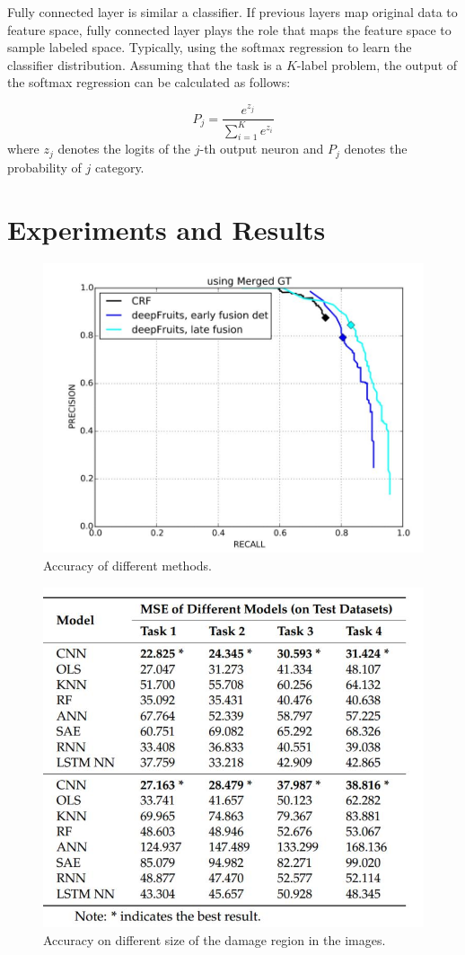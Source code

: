 \documentclass[sensors,article,submit,moreauthors,pdftex,10pt,a4paper]{mdpi}
\begin{document}
Fully connected layer is similar a classifier. If previous layers map original data to feature space, fully connected layer plays the role that maps the feature space to sample labeled space. Typically, using the softmax regression to learn the classifier distribution. Assuming that the task is a $K$-label problem, the output of the softmax
regression can be calculated as follows:

\begin{equation}
P_j = \frac{e^{z_j}}{\sum_{i=1}^{K}e^{z_i}}
\end{equation}
where $z_j$ denotes the logits of the $j$-th output neuron and $P_j$ denotes the probability of $j$ category.


\section{Experiments and Results}

\begin{figure}[H]
	\centering
	\includegraphics[width=12 cm]{4.jpg}
	\caption{Accuracy of different methods.}
	\label{Scene-ComparedNet}
\end{figure}

\begin{figure}[H]
	\centering
	\includegraphics[width=10 cm]{5.jpg}
	\caption{Accuracy on different size of the damage region in the images.}
	\label{Scene-ComparedNet}
\end{figure}
\end{document}

